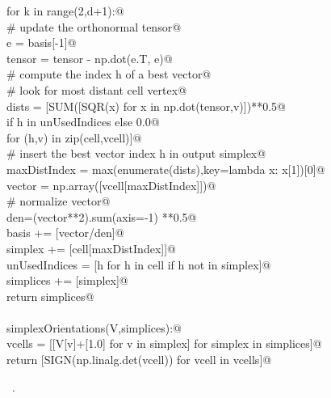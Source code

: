\documentclass[11pt,oneside]{article}    %
\begin{document}
\begin{flushleft}
\begin{list}{}{}
\mbox{}\verb@        for k in range(2,d+1):@\\
\mbox{}\verb@            # update the orthonormal tensor@\\
\mbox{}\verb@            e = basis[-1]@\\
\mbox{}\verb@            tensor = tensor - np.dot(e.T, e)@\\
\mbox{}\verb@            # compute the index h of a best vector@\\
\mbox{}\verb@            # look for most distant cell vertex@\\
\mbox{}\verb@            dists = [SUM([SQR(x) for x in np.dot(tensor,v)])**0.5@\\
\mbox{}\verb@            if h in unUsedIndices else 0.0@\\
\mbox{}\verb@            for (h,v) in zip(cell,vcell)]@\\
\mbox{}\verb@            # insert the best vector index h in output simplex@\\
\mbox{}\verb@            maxDistIndex = max(enumerate(dists),key=lambda x: x[1])[0]@\\
\mbox{}\verb@            vector = np.array([vcell[maxDistIndex]])@\\
\mbox{}\verb@            # normalize vector@\\
\mbox{}\verb@            den=(vector**2).sum(axis=-1) **0.5@\\
\mbox{}\verb@            basis += [vector/den]@\\
\mbox{}\verb@            simplex += [cell[maxDistIndex]]@\\
\mbox{}\verb@            unUsedIndices = [h for h in cell if h not in simplex]@\\
\mbox{}\verb@        simplices += [simplex]@\\
\mbox{}\verb@    return simplices@\\
\mbox{}\verb@@\\
\mbox{}\verb@def simplexOrientations(V,simplices):@\\
\mbox{}\verb@    vcells = [[V[v]+[1.0] for v in simplex] for simplex in simplices]@\\
\mbox{}\verb@    return [SIGN(np.linalg.det(vcell)) for vcell in vcells]@\\
\mbox{}\verb@@{\NWsep}
\end{list}
\vspace{-1ex}
\footnotesize\addtolength{\baselineskip}{-1ex}
\begin{list}{}{\setlength{\itemsep}{-\parsep}\setlength{\itemindent}{-\leftmargin}}
\item \NWtxtMacroRefIn\ .
\end{list}
\end{flushleft}
\end{document}
